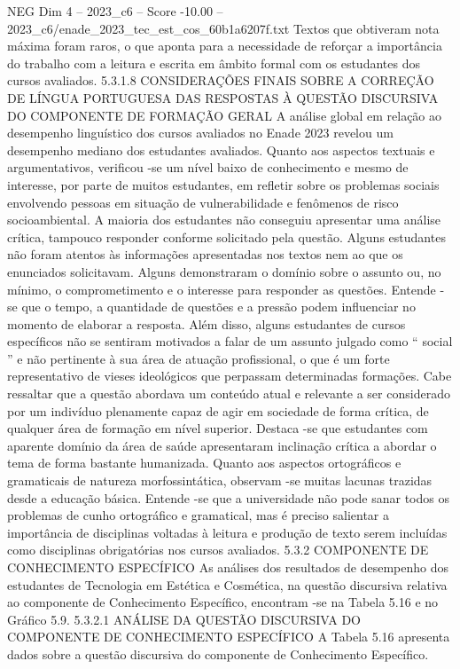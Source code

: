 \begin{textsample}{NEG Dim 4 – 2023\_c6 – Score -10.00 – 2023\_c6/enade\_2023\_tec\_est\_cos\_60b1a6207f.txt}
Textos que obtiveram nota máxima foram raros, o que aponta para a necessidade de reforçar a importância do trabalho com a leitura e escrita em âmbito formal com os estudantes dos cursos avaliados. 5.3.1.8 CONSIDERAÇÕES FINAIS SOBRE A CORREÇÃO DE LÍNGUA PORTUGUESA DAS RESPOSTAS À QUESTÃO DISCURSIVA DO COMPONENTE DE FORMAÇÃO GERAL A análise global em relação ao desempenho linguístico dos cursos avaliados no Enade 2023 revelou um desempenho mediano dos estudantes avaliados.
Quanto aos aspectos textuais e argumentativos, verificou -se um nível baixo de conhecimento e mesmo de interesse, por parte de muitos estudantes, em refletir sobre os problemas sociais envolvendo pessoas em situação de vulnerabilidade e fenômenos de risco socioambiental.
A maioria dos estudantes não conseguiu apresentar uma análise crítica, tampouco responder conforme solicitado pela questão.
Alguns estudantes não foram atentos às informações apresentadas nos textos nem ao que os enunciados solicitavam.
Alguns demonstraram o domínio sobre o assunto ou, no mínimo, o comprometimento e o interesse para responder as questões.
Entende -se que o tempo, a quantidade de questões e a pressão podem influenciar no momento de elaborar a resposta.
Além disso, alguns estudantes de cursos específicos não se sentiram motivados a falar de um assunto julgado como “ social ” e não pertinente à sua área de atuação profissional, o que é um forte representativo de vieses ideológicos que perpassam determinadas formações.
Cabe ressaltar que a questão abordava um conteúdo atual e relevante a ser considerado por um indivíduo plenamente capaz de agir em sociedade de forma crítica, de qualquer área de formação em nível superior.
Destaca -se que estudantes com aparente domínio da área de saúde apresentaram inclinação crítica a abordar o tema de forma bastante humanizada.
Quanto aos aspectos ortográficos e gramaticais de natureza morfossintática, observam -se muitas lacunas trazidas desde a educação básica.
Entende -se que a universidade não pode sanar todos os problemas de cunho ortográfico e gramatical, mas é preciso salientar a importância de disciplinas voltadas à leitura e produção de texto serem incluídas como disciplinas obrigatórias nos cursos avaliados. 5.3.2 COMPONENTE DE CONHECIMENTO ESPECÍFICO As análises dos resultados de desempenho dos estudantes de Tecnologia em Estética e Cosmética, na questão discursiva relativa ao componente de Conhecimento Específico, encontram -se na Tabela 5.16 e no Gráfico 5.9. 5.3.2.1 ANÁLISE DA QUESTÃO DISCURSIVA DO COMPONENTE DE CONHECIMENTO ESPECÍFICO A Tabela 5.16 apresenta dados sobre a questão discursiva do componente de Conhecimento Específico.

\end{textsample}
